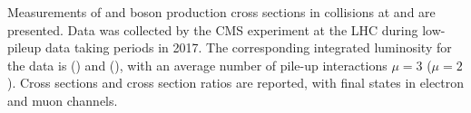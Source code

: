 % 
% 
%

Measurements of \W and \Z boson production cross sections in \pp collisions at \sg and \sh are presented. Data was collected by the CMS experiment at the LHC during low-pileup data taking periods in 2017. The corresponding integrated luminosity for the data is \lumig (\sg) and \lumih (\sh), with an average number of pile-up interactions $\mu=3$ ($\mu=2$). Cross sections and cross section ratios are reported, with final states in electron and muon channels. 

